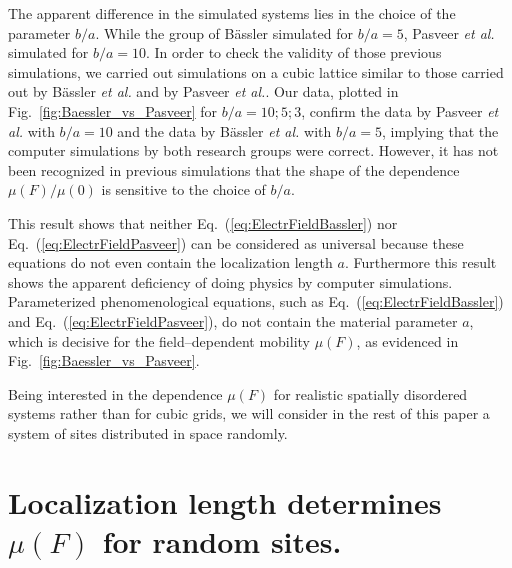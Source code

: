 \documentclass[aps,reprint,amsmath,amssymb,superscriptaddress,showpacs,prb]{revtex4-1}
\renewcommand{\alpha}{ a }
\begin{document}
The apparent difference in the simulated systems lies in the choice of the parameter $b/\alpha$. While the group of B\"{a}ssler simulated for $b/\alpha=5$, Pasveer \textit{et al.} simulated for $b/\alpha=10$. In order to check the validity of those previous simulations, we carried out simulations on a cubic lattice similar to those carried out by B\"{a}ssler \textit{et al.} and by Pasveer \textit{et al.}. Our data, plotted in Fig.~\ref{fig:Baessler_vs_Pasveer} for $b/\alpha=10; 5; 3$, confirm the data by Pasveer \textit{et al.} with $b/\alpha=10$ and the data by B\"{a}ssler \textit{et al.} with $b/\alpha=5$, implying that the computer simulations by both research groups \cite{Borsenberger1991,Bassler1993,Pasveer2005} were correct. However, it has not been recognized in previous simulations that the shape of the dependence $\mu(F)/\mu(0)$ is sensitive to the choice of $b/\alpha$.

This result shows that neither Eq.~(\ref{eq:ElectrFieldBassler}) nor Eq.~(\ref{eq:ElectrFieldPasveer}) can be considered as universal because these equations do not even contain the localization length $a$. Furthermore this result shows the apparent deficiency of doing physics by computer simulations. Parameterized phenomenological equations, such as Eq.~(\ref{eq:ElectrFieldBassler}) and Eq.~(\ref{eq:ElectrFieldPasveer}), do not contain the material parameter $a$, which is decisive for the field--dependent mobility $\mu(F)$, as evidenced in Fig.~\ref{fig:Baessler_vs_Pasveer}.

Being interested in the dependence $\mu(F)$ for realistic spatially disordered systems rather than for cubic grids, we will consider in the rest of this paper a system of sites distributed in space randomly.


\section{Localization length determines $\mu(F)$ for random sites.}
\label{sec:Teff simulations}
\end{document}
